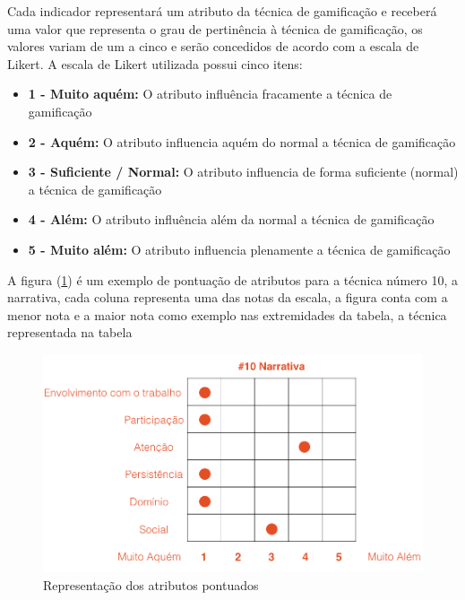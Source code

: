 Cada indicador representará um atributo da técnica de gamificação e receberá uma valor que representa o grau de pertinência à técnica de gamificação, os valores variam de um a cinco e serão concedidos de acordo com a escala de Likert. A escala de Likert utilizada possui cinco itens: 

\begin{itemize}
\item  \textbf {1 - Muito aquém:} O atributo influência fracamente a técnica de gamificação
\item  \textbf {2 - Aquém:} O atributo influencia aquém do normal a técnica de gamificação
\item  \textbf {3 - Suficiente / Normal:} O atributo influencia de forma suficiente (normal) a técnica de gamificação
\item  \textbf {4 - Além:} O atributo influência além da normal a técnica de gamificação
\item  \textbf {5 - Muito além:} O atributo influencia plenamente a técnica de gamificação
\end{itemize}

\newpage


A figura (\ref{fig02}) é um exemplo de pontuação de atributos para a técnica número 10, a narrativa, cada coluna representa uma das notas da escala, a figura conta com a menor nota e a maior nota como exemplo nas extremidades da tabela, a técnica representada na tabela 

\begin{figure}[h]
	\centering
		\includegraphics[keepaspectratio=true,scale=0.5]{figuras/notas.png}
	\caption{Representação dos atributos pontuados\label{fig02}}
\end{figure}




